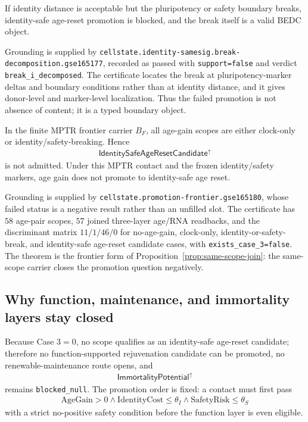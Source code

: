 \begin{theorem}
\label{thm:structured-negative-evidence}
If identity distance is acceptable but the pluripotency or safety boundary breaks, identity-safe age-reset promotion is blocked, and the break itself is a valid BEDC object.
\end{theorem}

Grounding is supplied by \texttt{cellstate.identity-samesig.break-decomposition.gse165177}, recorded as passed with \texttt{support=false} and verdict \texttt{break\_i\_decomposed}. The certificate locates the break at pluripotency-marker deltas and boundary conditions rather than at identity distance, and it gives donor-level and marker-level localization. Thus the failed promotion is not absence of content; it is a typed boundary object.

\begin{theorem}
\label{thm:promotion-frontier-closes-negatively}
In the finite MPTR frontier carrier $B_F$, all age-gain scopes are either clock-only or identity/safety-breaking. Hence
$$
\begin{aligned}
\mathsf{IdentitySafeAgeResetCandidate}^{\uparrow}
\end{aligned}
$$
is not admitted. Under this MPTR contact and the frozen identity/safety markers, age gain does not promote to identity-safe age reset.
\end{theorem}

Grounding is supplied by \texttt{cellstate.promotion-frontier.gse165180}, whose failed status is a negative result rather than an unfilled slot. The certificate has $58$ age-pair scopes, $57$ joined three-layer age/RNA readbacks, and the discriminant matrix $11/1/46/0$ for no-age-gain, clock-only, identity-or-safety-break, and identity-safe age-reset candidate cases, with \texttt{exists\_case\_3=false}. The theorem is the frontier form of Proposition~\ref{prop:same-scope-join}: the same-scope carrier closes the promotion question negatively.

\subsection{Why function, maintenance, and immortality layers stay closed}

Because Case $3=0$, no scope qualifies as an identity-safe age-reset candidate; therefore no function-supported rejuvenation candidate can be promoted, no renewable-maintenance route opens, and
$$
\begin{aligned}
\mathsf{ImmortalityPotential}^{\uparrow}
\end{aligned}
$$
remains \texttt{blocked\_null}. The promotion order is fixed: a contact must first pass
$$
\begin{aligned}
\mathrm{AgeGain}>0\wedge \mathrm{IdentityCost}\le\theta_I\wedge
\mathrm{SafetyRisk}\le\theta_S
\end{aligned}
$$
with a strict no-positive safety condition before the function layer is even eligible.

